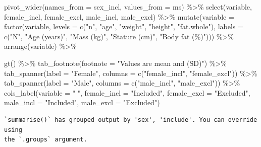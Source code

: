 \documentclass[
  11pt,
  letterpaper,
]{scrbook}
\newenvironment{Shaded}{\begin{snugshade}}{\end{snugshade}}
\newcommand{\AttributeTok}[1]{\textcolor[rgb]{0.40,0.45,0.13}{#1}}
\newcommand{\FunctionTok}[1]{\textcolor[rgb]{0.28,0.35,0.67}{#1}}
\newcommand{\NormalTok}[1]{\textcolor[rgb]{0.00,0.23,0.31}{#1}}
\newcommand{\SpecialCharTok}[1]{\textcolor[rgb]{0.37,0.37,0.37}{#1}}
\newcommand{\StringTok}[1]{\textcolor[rgb]{0.13,0.47,0.30}{#1}}
\begin{document}
\begin{Shaded}
\begin{Highlighting}[numbers=left,,]
  \FunctionTok{pivot\_wider}\NormalTok{(}\AttributeTok{names\_from =}\NormalTok{ sex\_incl, }
              \AttributeTok{values\_from =}\NormalTok{ ms) }\SpecialCharTok{\%\textgreater{}\%}
  \FunctionTok{select}\NormalTok{(variable, female\_incl, female\_excl, male\_incl, male\_excl) }\SpecialCharTok{\%\textgreater{}\%}
  \FunctionTok{mutate}\NormalTok{(}\AttributeTok{variable =} \FunctionTok{factor}\NormalTok{(variable, }\AttributeTok{levels =} \FunctionTok{c}\NormalTok{(}\StringTok{"n"}\NormalTok{, }\StringTok{"age"}\NormalTok{, }\StringTok{"weight"}\NormalTok{, }\StringTok{"height"}\NormalTok{, }\StringTok{"fat.whole"}\NormalTok{), }
                           \AttributeTok{labels =} \FunctionTok{c}\NormalTok{(}\StringTok{"N"}\NormalTok{, }\StringTok{"Age (years)"}\NormalTok{, }\StringTok{"Mass (kg)"}\NormalTok{, }
                                      \StringTok{"Stature (cm)"}\NormalTok{, }\StringTok{"Body fat (\%)"}\NormalTok{))) }\SpecialCharTok{\%\textgreater{}\%}
  \FunctionTok{arrange}\NormalTok{(variable) }\SpecialCharTok{\%\textgreater{}\%}
  
  \FunctionTok{gt}\NormalTok{() }\SpecialCharTok{\%\textgreater{}\%}
  \FunctionTok{tab\_footnote}\NormalTok{(}\AttributeTok{footnote =} \StringTok{"Values are mean and (SD)"}\NormalTok{) }\SpecialCharTok{\%\textgreater{}\%}
  \FunctionTok{tab\_spanner}\NormalTok{(}\AttributeTok{label =} \StringTok{"Female"}\NormalTok{, }\AttributeTok{columns =} \FunctionTok{c}\NormalTok{(}\StringTok{"female\_incl"}\NormalTok{, }\StringTok{"female\_excl"}\NormalTok{)) }\SpecialCharTok{\%\textgreater{}\%}
  \FunctionTok{tab\_spanner}\NormalTok{(}\AttributeTok{label =} \StringTok{"Male"}\NormalTok{, }\AttributeTok{columns =} \FunctionTok{c}\NormalTok{(}\StringTok{"male\_incl"}\NormalTok{, }\StringTok{"male\_excl"}\NormalTok{)) }\SpecialCharTok{\%\textgreater{}\%}
  \FunctionTok{cols\_label}\NormalTok{(}\AttributeTok{variable =} \StringTok{" "}\NormalTok{, }
             \AttributeTok{female\_incl =} \StringTok{"Included"}\NormalTok{, }
             \AttributeTok{female\_excl =} \StringTok{"Excluded"}\NormalTok{, }
             \AttributeTok{male\_incl =} \StringTok{"Included"}\NormalTok{, }
             \AttributeTok{male\_excl =} \StringTok{"Excluded"}\NormalTok{)}
\end{Highlighting}
\end{Shaded}

\begin{verbatim}
`summarise()` has grouped output by 'sex', 'include'. You can override using
the `.groups` argument.
\end{verbatim}
\end{document}
